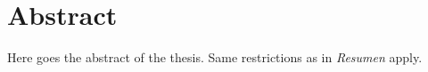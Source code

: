 \chapter*{Abstract}
Here goes the abstract of the thesis. Same restrictions as in \emph{Resumen} apply.
